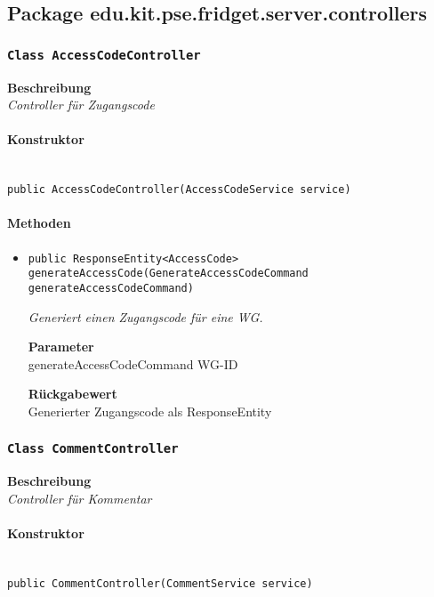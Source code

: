 

%
    \subsection{Package edu.kit.pse.fridget.server.controllers}
    \subsubsection{\texttt{Class AccessCodeController}}
    \textbf{Beschreibung} \\
    \textit{Controller für Zugangscode}
    \paragraph*{Konstruktor}\mbox{} \\
    \texttt{public AccessCodeController(AccessCodeService service)} \\
    \paragraph*{Methoden}
    \begin{itemize}
    	\item{\texttt{public ResponseEntity<AccessCode> generateAccessCode(GenerateAccessCodeCommand generateAccessCodeCommand)}}
    	
    	\textit{Generiert einen Zugangscode für eine WG.}
    	
    	\textbf{Parameter} \\
    	generateAccessCodeCommand WG-ID
    	
    	\textbf{Rückgabewert} \\
    	Generierter Zugangscode als ResponseEntity
    \end{itemize}
    \subsubsection{\texttt{Class CommentController}}
    \textbf{Beschreibung} \\
    \textit{Controller für Kommentar}
    \paragraph*{Konstruktor}\mbox{} \\
    \texttt{public CommentController(CommentService service)} \\
